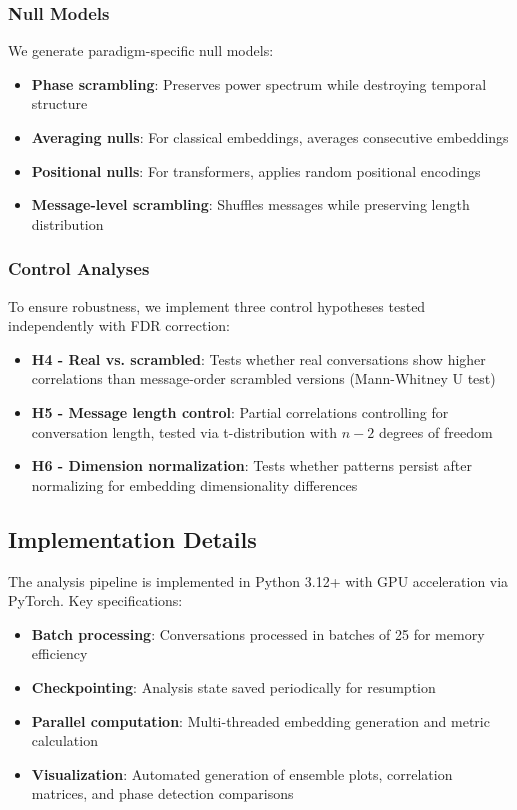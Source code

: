 \documentclass[11pt,letterpaper]{article}
\begin{document}
\subsubsection{Null Models}

We generate paradigm-specific null models:
\begin{itemize}
\item \textbf{Phase scrambling}: Preserves power spectrum while destroying temporal structure
\item \textbf{Averaging nulls}: For classical embeddings, averages consecutive embeddings
\item \textbf{Positional nulls}: For transformers, applies random positional encodings
\item \textbf{Message-level scrambling}: Shuffles messages while preserving length distribution
\end{itemize}

\subsubsection{Control Analyses}

To ensure robustness, we implement three control hypotheses tested independently with FDR correction:

\begin{itemize}
\item \textbf{H4 - Real vs. scrambled}: Tests whether real conversations show higher correlations than message-order scrambled versions (Mann-Whitney U test)
\item \textbf{H5 - Message length control}: Partial correlations controlling for conversation length, tested via t-distribution with $n-2$ degrees of freedom
\item \textbf{H6 - Dimension normalization}: Tests whether patterns persist after normalizing for embedding dimensionality differences
\end{itemize}

\subsection{Implementation Details}

The analysis pipeline is implemented in Python 3.12+ with GPU acceleration via PyTorch. Key specifications:
\begin{itemize}
\item \textbf{Batch processing}: Conversations processed in batches of 25 for memory efficiency
\item \textbf{Checkpointing}: Analysis state saved periodically for resumption
\item \textbf{Parallel computation}: Multi-threaded embedding generation and metric calculation
\item \textbf{Visualization}: Automated generation of ensemble plots, correlation matrices, and phase detection comparisons
\end{itemize}
\end{document}

